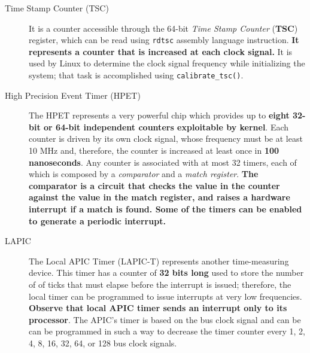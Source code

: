 \documentclass[10pt,a4paper]{article}
\begin{document}
\begin{description}
\item[Time Stamp Counter (TSC)] It is a counter accessible through the 64-bit \textit{Time Stamp Counter} (\textbf{TSC}) register, which can be read using \texttt{rdtsc} assembly language instruction. \textbf{It represents a counter that is increased at each clock signal.} It is used by Linux to determine the clock signal frequency while initializing the system; that task is accomplished using \texttt{calibrate\_tsc()}.
\item[High Precision Event Timer (HPET)] The HPET represents a very powerful chip which provides up to \textbf{eight 32-bit or 64-bit independent counters exploitable by kernel}. Each counter is driven by its own clock signal, whose frequency must be at least 10 MHz and, therefore, the counter is increased at least once in \textbf{100 nanoseconds}. Any counter is associated with at most 32 timers, each of which is composed by a \textit{comparator} and a \textit{match register}. \textbf{The comparator is a circuit that checks the value in the counter against the value in the match register, and raises a hardware interrupt if a match is found. Some of the timers can be enabled to generate a periodic interrupt.}
\item[LAPIC] The Local APIC Timer (LAPIC-T) represents another time-measuring device. This timer has a counter of \textbf{32 bits long} used to store the number of of ticks that must elapse before the interrupt is issued; therefore, the local timer can be programmed to issue interrupts at very low frequencies. \textbf{Observe that local APIC timer sends an interrupt only to its processor}. The APIC’s timer is based on the bus clock signal and can be can be programmed in such a way to decrease the timer counter every 1, 2, 4, 8, 16, 32, 64, or 128 bus clock signals.

\end{description}
\end{document}
